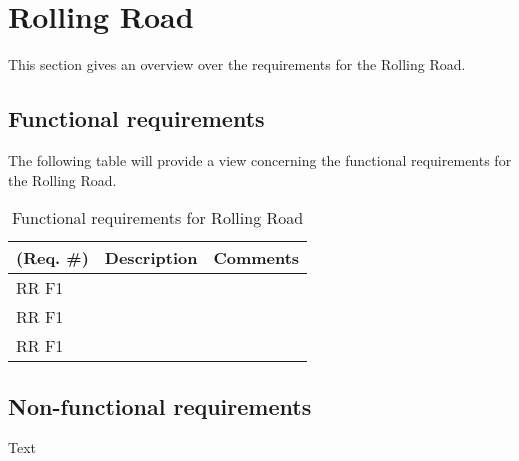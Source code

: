 \section{Rolling Road}
This section gives an overview over the requirements for the Rolling Road. 

\subsection{Functional requirements}
The following table will provide a view concerning the functional requirements for the Rolling Road.

\begin{table}[h!]
	\centering
	\label{my-label}
	\begin{tabular}{|p{2 cm}|p{4 cm}|p{3 cm}|}
	\hline
	\textbf{(Req. \#)} & \textbf{Description} & \textbf{Comments} \\\hline
	RR F1	&  &  \\\hline
	RR F1	&  &   \\\hline
	RR F1	&  &   \\\hline
	\end{tabular}
	\caption{Functional requirements for Rolling Road}
\end{table}

\subsection{Non-functional requirements}
Text
